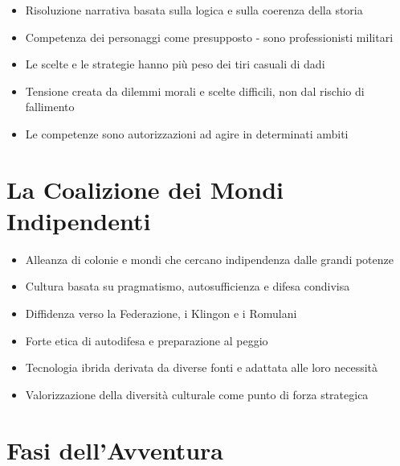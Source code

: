 \documentclass[11pt,a4paper]{article}
\begin{document}
\begin{tcolorbox}[colback=militarylightgray!10, colframe=militaryred]
\begin{itemize}[leftmargin=*]
\item Risoluzione narrativa basata sulla logica e sulla coerenza della storia
\item Competenza dei personaggi come presupposto - sono professionisti militari
\item Le scelte e le strategie hanno più peso dei tiri casuali di dadi
\item Tensione creata da dilemmi morali e scelte difficili, non dal rischio di fallimento
\item Le competenze sono autorizzazioni ad agire in determinati ambiti
\end{itemize}
\end{tcolorbox}

\section{La Coalizione dei Mondi Indipendenti}

\begin{tcolorbox}[colback=militarylightgray!10, colframe=militaryred]
\begin{itemize}[leftmargin=*]
\item Alleanza di colonie e mondi che cercano indipendenza dalle grandi potenze
\item Cultura basata su pragmatismo, autosufficienza e difesa condivisa
\item Diffidenza verso la Federazione, i Klingon e i Romulani
\item Forte etica di autodifesa e preparazione al peggio
\item Tecnologia ibrida derivata da diverse fonti e adattata alle loro necessità
\item Valorizzazione della diversità culturale come punto di forza strategica
\end{itemize}
\end{tcolorbox}

\section{Fasi dell'Avventura}
\end{document}
